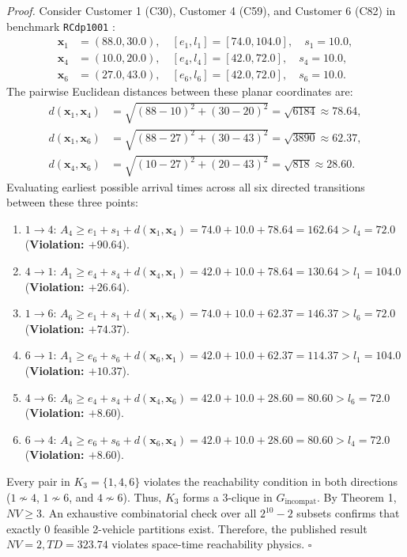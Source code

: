 \documentclass[review]{elsarticle}
\begin{document}
\vspace{0.15cm}
\noindent\textit{Proof.}
Consider Customer 1 (C30), Customer 4 (C59), and Customer 6 (C82) in benchmark \texttt{RCdp1001} \citep{wang2012coevolutionary}:
\begin{align*}
\mathbf{x}_1 &= (88.0, 30.0), \quad [e_1, l_1] = [74.0, 104.0], \quad s_1 = 10.0, \\
\mathbf{x}_4 &= (10.0, 20.0), \quad [e_4, l_4] = [42.0, 72.0], \quad s_4 = 10.0, \\
\mathbf{x}_6 &= (27.0, 43.0), \quad [e_6, l_6] = [42.0, 72.0], \quad s_6 = 10.0.
\end{align*}
The pairwise Euclidean distances between these planar coordinates are:
\begin{align*}
d(\mathbf{x}_1, \mathbf{x}_4) &= \sqrt{(88 - 10)^2 + (30 - 20)^2} = \sqrt{6184} \approx 78.64, \\
d(\mathbf{x}_1, \mathbf{x}_6) &= \sqrt{(88 - 27)^2 + (30 - 43)^2} = \sqrt{3890} \approx 62.37, \\
d(\mathbf{x}_4, \mathbf{x}_6) &= \sqrt{(10 - 27)^2 + (20 - 43)^2} = \sqrt{818} \approx 28.60.
\end{align*}
Evaluating earliest possible arrival times across all six directed transitions between these three points:
\begin{enumerate}
    \item $1 \to 4$: $A_4 \ge e_1 + s_1 + d(\mathbf{x}_1, \mathbf{x}_4) = 74.0 + 10.0 + 78.64 = 162.64 > l_4 = 72.0$ (\textbf{Violation: $+90.64$}).
    \item $4 \to 1$: $A_1 \ge e_4 + s_4 + d(\mathbf{x}_4, \mathbf{x}_1) = 42.0 + 10.0 + 78.64 = 130.64 > l_1 = 104.0$ (\textbf{Violation: $+26.64$}).
    \item $1 \to 6$: $A_6 \ge e_1 + s_1 + d(\mathbf{x}_1, \mathbf{x}_6) = 74.0 + 10.0 + 62.37 = 146.37 > l_6 = 72.0$ (\textbf{Violation: $+74.37$}).
    \item $6 \to 1$: $A_1 \ge e_6 + s_6 + d(\mathbf{x}_6, \mathbf{x}_1) = 42.0 + 10.0 + 62.37 = 114.37 > l_1 = 104.0$ (\textbf{Violation: $+10.37$}).
    \item $4 \to 6$: $A_6 \ge e_4 + s_4 + d(\mathbf{x}_4, \mathbf{x}_6) = 42.0 + 10.0 + 28.60 = 80.60 > l_6 = 72.0$ (\textbf{Violation: $+8.60$}).
    \item $6 \to 4$: $A_4 \ge e_6 + s_6 + d(\mathbf{x}_6, \mathbf{x}_4) = 42.0 + 10.0 + 28.60 = 80.60 > l_4 = 72.0$ (\textbf{Violation: $+8.60$}).
\end{enumerate}
Every pair in $K_3 = \{1, 4, 6\}$ violates the reachability condition in both directions ($1 \nsim 4$, $1 \nsim 6$, and $4 \nsim 6$). Thus, $K_3$ forms a 3-clique in $G_{\text{incompat}}$. By Theorem 1, $NV \ge 3$. An exhaustive combinatorial check over all $2^{10}-2$ subsets confirms that exactly $0$ feasible 2-vehicle partitions exist. Therefore, the published result $NV = 2, TD = 323.74$ violates space-time reachability physics. \hfill $\square$
\end{document}
